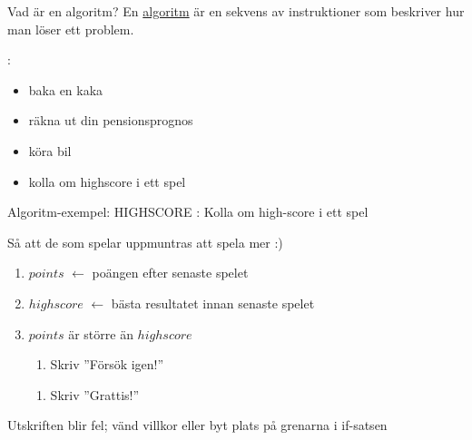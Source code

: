 \begin{Slide}{Vad är en algoritm?}
En \href{https://sv.wikipedia.org/wiki/Algoritm}{algoritm} är en sekvens av instruktioner som beskriver hur man löser ett problem.

\vspace{1em}:
\begin{itemize}
\item	 baka en kaka
\pause\item räkna ut din pensionsprognos
\pause\item köra bil
\pause\item kolla om highscore i ett spel
\end{itemize}
\ifkompendium\else
{}
\fi
\end{Slide}


\ifkompendium\else
\begin{SlideExtra}{Algoritm-exempel: HIGHSCORE}
: Kolla om high-score i ett spel \\ \vspace{1em}

 \pause Så att de som spelar uppmuntras att spela mer :) \\ \vspace{1em}

\pause
\begin{enumerate}
\item $points$ $\leftarrow$ poängen efter senaste spelet
\item $highscore$ $\leftarrow$ bästa resultatet innan senaste spelet
\item {} $points$ är större än $highscore$ 
\begin{enumerate}[ ~~]
\item  Skriv ''Försök igen!''
\end{enumerate}
\begin{enumerate}[ ~~]
\item  Skriv ''Grattis!''
\end{enumerate}
\end{enumerate}
\pause
\scriptsize {}

\pause Utskriften blir fel; vänd villkor eller byt plats på grenarna i if-satsen
\end{SlideExtra}
\fi

